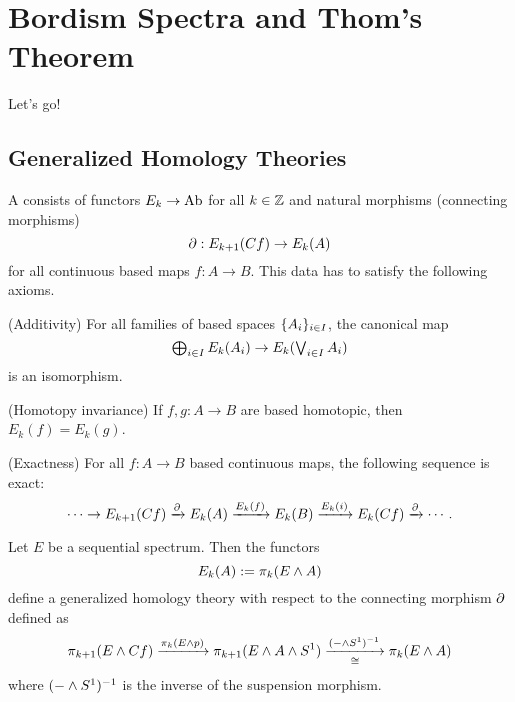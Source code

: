 
\chapter{Bordism Spectra and Thom's Theorem}


\noindent
Let's go!

\section{Generalized Homology Theories}

\begin{definition}
A  consists of functors $E_k\to{\normalfont\textup{Ab}}$ for all $k\in{\mathbb Z}$ and natural morphisms (connecting morphisms)
\[\partial:E_{k+1}(Cf)\to E_k(A)\]
for all continuous based maps $f:A\to B$. This data has to satisfy the following axioms.
\begin{rmnumerate}
    \item (Additivity) For all families of based spaces $\{A_i\}_{i\in I}$, the canonical map
    \[\textstyle\bigoplus_{i\in I}E_k(A_i)\to E_k(\textstyle\bigvee_{i\in I}A_i)\]
    is an isomorphism.
    
    \item (Homotopy invariance) If $f,g:A\to B$ are based homotopic, then $E_k(f)=E_k(g)$.
    
    \item (Exactness) For all $f:A\to B$ based continuous maps, the following sequence is exact:
    \[\cdots\to E_{k+1}(Cf)\xrightarrow{\partial}E_k(A)\xrightarrow{E_k(f)}E_k(B)\xrightarrow{E_k(i)}E_k(Cf)\xrightarrow{\partial}\cdots.\]
\end{rmnumerate}
\end{definition}

\begin{example!}\label{example:sequential-spectra-are-homology-theories}
Let $E$ be a sequential spectrum. Then the functors
\[E_k(A):=\pi_k(E\wedge A)\]
define a generalized homology theory with respect to the connecting morphism $\partial$ defined as
\[\pi_{k+1}(E\wedge Cf)\xrightarrow{\pi_k(E\wedge p)}\pi_{k+1}(E\wedge A\wedge S^1)\underset{\cong}{\xrightarrow{(-\wedge S^1)^{-1}}}\pi_k(E\wedge A)\]
where $(-\wedge S^1)^{-1}$ is the inverse of the suspension morphism.
\end{example!}

